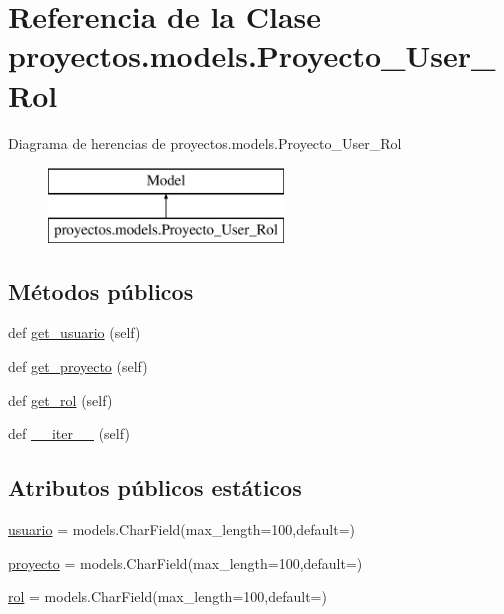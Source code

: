 \hypertarget{classproyectos_1_1models_1_1_proyecto___user___rol}{}\section{Referencia de la Clase proyectos.\+models.\+Proyecto\+\_\+\+User\+\_\+\+Rol}
\label{classproyectos_1_1models_1_1_proyecto___user___rol}
Diagrama de herencias de proyectos.\+models.\+Proyecto\+\_\+\+User\+\_\+\+Rol\begin{figure}[H]
\begin{center}
\leavevmode
\includegraphics[height=2.000000cm]{classproyectos_1_1models_1_1_proyecto___user___rol}
\end{center}
\end{figure}
\subsection*{Métodos públicos}
\begin{DoxyCompactItemize}
\item 
def \hyperlink{classproyectos_1_1models_1_1_proyecto___user___rol_a161a1d2f55e527952f327fb67863f501}{get\+\_\+usuario} (self)
\item 
def \hyperlink{classproyectos_1_1models_1_1_proyecto___user___rol_a95288e288d1727f66a57edcd200a349b}{get\+\_\+proyecto} (self)
\item 
def \hyperlink{classproyectos_1_1models_1_1_proyecto___user___rol_a29187800b73103ccbfc9416675f50e8b}{get\+\_\+rol} (self)
\item 
def \hyperlink{classproyectos_1_1models_1_1_proyecto___user___rol_a460ad343f818e6facedff23396273071}{\+\_\+\+\_\+iter\+\_\+\+\_\+} (self)
\end{DoxyCompactItemize}
\subsection*{Atributos públicos estáticos}
\begin{DoxyCompactItemize}
\item 
\hyperlink{classproyectos_1_1models_1_1_proyecto___user___rol_a212532a667651bc8579d785dc09c99aa}{usuario} = models.\+Char\+Field(max\+\_\+length=100,default=\textquotesingle{}\textquotesingle{})
\item 
\hyperlink{classproyectos_1_1models_1_1_proyecto___user___rol_a8826ac82dc33f736475e19a70900bf2e}{proyecto} = models.\+Char\+Field(max\+\_\+length=100,default=\textquotesingle{}\textquotesingle{})
\item 
\hyperlink{classproyectos_1_1models_1_1_proyecto___user___rol_a9734b6228a956c010d5af0ba68466954}{rol} = models.\+Char\+Field(max\+\_\+length=100,default=\textquotesingle{}\textquotesingle{})
\end{DoxyCompactItemize}


